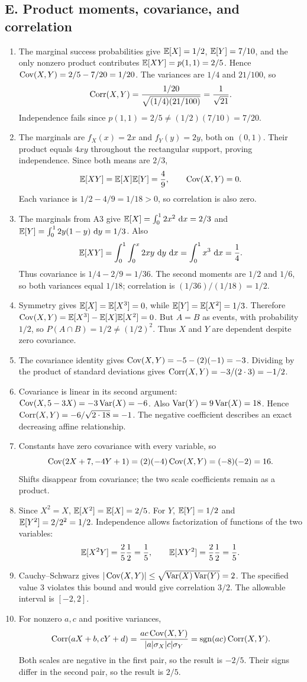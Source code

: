 \subsection{E. Product moments, covariance, and correlation}
\begin{enumerate}[label=\textbf{E\arabic*.},leftmargin=*,itemsep=1em]
\item The marginal success probabilities give $\mathbb E[X]=1/2$, $\mathbb E[Y]=7/10$, and the only nonzero product contributes $\mathbb E[XY]=p(1,1)=2/5$. Hence $\operatorname{Cov}(X,Y)=2/5-7/20=1/20$. The variances are $1/4$ and $21/100$, so
\[
\operatorname{Corr}(X,Y)=\frac{1/20}{\sqrt{(1/4)(21/100)}}=\frac1{\sqrt{21}}.
\]
Independence fails since $p(1,1)=2/5\ne(1/2)(7/10)=7/20$.
\item The marginals are $f_X(x)=2x$ and $f_Y(y)=2y$, both on $(0,1)$. Their product equals $4xy$ throughout the rectangular support, proving independence. Since both means are $2/3$,
\[
\mathbb E[XY]=\mathbb E[X]\mathbb E[Y]=\frac49,\qquad \operatorname{Cov}(X,Y)=0.
\]
Each variance is $1/2-4/9=1/18>0$, so correlation is also zero.
\item The marginals from A3 give $\mathbb E[X]=\int_0^12x^2\,\,\mathrm d x=2/3$ and $\mathbb E[Y]=\int_0^12y(1-y)\,\,\mathrm d y=1/3$. Also
\[
\mathbb E[XY]=\int_0^1\int_0^x2xy\,\,\mathrm d y\,\,\mathrm d x=\int_0^1x^3\,\,\mathrm d x=\frac14.
\]
Thus covariance is $1/4-2/9=1/36$. The second moments are $1/2$ and $1/6$, so both variances equal $1/18$; correlation is $(1/36)/(1/18)=1/2$.
\item Symmetry gives $\mathbb E[X]=\mathbb E[X^3]=0$, while $\mathbb E[Y]=\mathbb E[X^2]=1/3$. Therefore $\operatorname{Cov}(X,Y)=\mathbb E[X^3]-\mathbb E[X]\mathbb E[X^2]=0$. But $A=B$ as events, with probability $1/2$, so $P(A\cap B)=1/2\ne(1/2)^2$. Thus $X$ and $Y$ are dependent despite zero covariance.
\item The covariance identity gives $\operatorname{Cov}(X,Y)=-5-(2)(-1)=-3$. Dividing by the product of standard deviations gives $\operatorname{Corr}(X,Y)=-3/(2\cdot3)=-1/2$.
\item Covariance is linear in its second argument: $\operatorname{Cov}(X,5-3X)=-3\operatorname{Var}(X)=-6$. Also $\operatorname{Var}(Y)=9\operatorname{Var}(X)=18$. Hence $\operatorname{Corr}(X,Y)=-6/\sqrt{2\cdot18}=-1$. The negative coefficient describes an exact decreasing affine relationship.
\item Constants have zero covariance with every variable, so
\[
\operatorname{Cov}(2X+7,-4Y+1)=(2)(-4)\operatorname{Cov}(X,Y)=(-8)(-2)=16.
\]
Shifts disappear from covariance; the two scale coefficients remain as a product.
\item Since $X^2=X$, $\mathbb E[X^2]=\mathbb E[X]=2/5$. For $Y$, $\mathbb E[Y]=1/2$ and $\mathbb E[Y^2]=2/2^2=1/2$. Independence allows factorization of functions of the two variables:
\[
\mathbb E[X^2Y]=\frac25\frac12=\frac15,\qquad
\mathbb E[XY^2]=\frac25\frac12=\frac15.
\]
\item Cauchy--Schwarz gives $|\operatorname{Cov}(X,Y)|\leq\sqrt{\operatorname{Var}(X)\operatorname{Var}(Y)}=2$. The specified value $3$ violates this bound and would give correlation $3/2$. The allowable interval is $[-2,2]$.
\item For nonzero $a,c$ and positive variances,
\[
\operatorname{Corr}(aX+b,cY+d)=\frac{ac\operatorname{Cov}(X,Y)}{|a|\sigma_X|c|\sigma_Y}
=\operatorname{sgn}(ac)\operatorname{Corr}(X,Y).
\]
Both scales are negative in the first pair, so the result is $-2/5$. Their signs differ in the second pair, so the result is $2/5$.
\end{enumerate}


